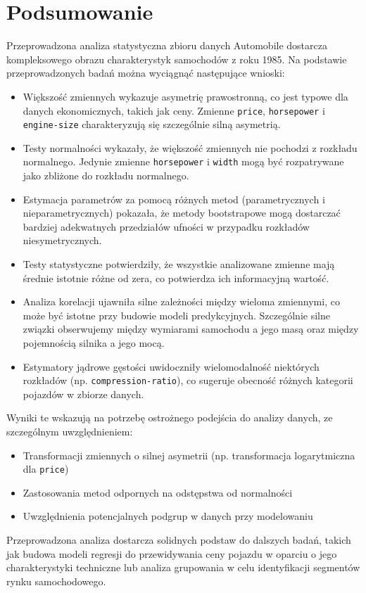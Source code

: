 \documentclass[12pt,a4paper]{article}
\begin{document}
\section{Podsumowanie}

Przeprowadzona analiza statystyczna zbioru danych Automobile dostarcza kompleksowego obrazu charakterystyk samochodów z roku 1985. Na podstawie przeprowadzonych badań można wyciągnąć następujące wnioski:

\begin{itemize}
    \item Większość zmiennych wykazuje asymetrię prawostronną, co jest typowe dla danych ekonomicznych, takich jak ceny. Zmienne \texttt{price}, \texttt{horsepower} i \texttt{engine-size} charakteryzują się szczególnie silną asymetrią.
    
    \item Testy normalności wykazały, że większość zmiennych nie pochodzi z rozkładu normalnego. Jedynie zmienne \texttt{horsepower} i \texttt{width} mogą być rozpatrywane jako zbliżone do rozkładu normalnego.
    
    \item Estymacja parametrów za pomocą różnych metod (parametrycznych i nieparametrycznych) pokazała, że metody bootstrapowe mogą dostarczać bardziej adekwatnych przedziałów ufności w przypadku rozkładów niesymetrycznych.
    
    \item Testy statystyczne potwierdziły, że wszystkie analizowane zmienne mają średnie istotnie różne od zera, co potwierdza ich informacyjną wartość.
    
    \item Analiza korelacji ujawniła silne zależności między wieloma zmiennymi, co może być istotne przy budowie modeli predykcyjnych. Szczególnie silne związki obserwujemy między wymiarami samochodu a jego masą oraz między pojemnością silnika a jego mocą.
    
    \item Estymatory jądrowe gęstości uwidoczniły wielomodalność niektórych rozkładów (np. \texttt{compression-ratio}), co sugeruje obecność różnych kategorii pojazdów w zbiorze danych.
\end{itemize}

Wyniki te wskazują na potrzebę ostrożnego podejścia do analizy danych, ze szczególnym uwzględnieniem:
\begin{itemize}
    \item Transformacji zmiennych o silnej asymetrii (np. transformacja logarytmiczna dla \texttt{price})
    \item Zastosowania metod odpornych na odstępstwa od normalności
    \item Uwzględnienia potencjalnych podgrup w danych przy modelowaniu
\end{itemize}

Przeprowadzona analiza dostarcza solidnych podstaw do dalszych badań, takich jak budowa modeli regresji do przewidywania ceny pojazdu w oparciu o jego charakterystyki techniczne lub analiza grupowania w celu identyfikacji segmentów rynku samochodowego.
\end{document}
